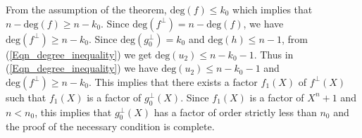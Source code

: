 \documentclass[10pt,journal]{IEEEtran}
\def \deg{{\mathrm{deg}}}
\begin{document}
From the assumption of the theorem, $\deg(f) \leq k_0$ which implies that $n-\deg(f) \geq n-k_0$.
Since $\deg(f^{\perp}) = n - \deg(f)$, we have $\deg(f^{\perp}) \geq n-k_0$. Since $\deg(g_0^{\perp}) = k_0$
and $\deg(h) \leq n-1$, from (\ref{Eqn_degree_inequality}) we get $\deg(u_2) \leq n-k_0-1$.
Thus in (\ref{Eqn_degree_inequality}) we have $\deg(u_2) \leq n-k_0-1$ and $\deg(f^{\perp}) \geq n-k_0$.
This implies that there exists a factor $f_1(X)$ of $f^{\perp}(X)$ such that $f_1(X)$ is a factor of $g_0^{\perp}(X)$.
Since $f_1(X)$ is a factor of $X^n+1$ and $n < n_0$, this implies that $g_0^{\perp}(X)$ has a factor of order
strictly less than $n_0$ and
the proof of the necessary condition is complete.

\end{document}
